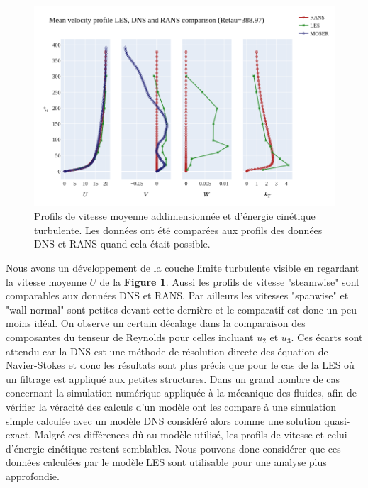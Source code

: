 \documentclass[12pt]{article}   %
\theoremstyle{plain}
\theoremstyle{remark}
\begin{document}
\begin{figure}[H]
	\begin{center}
		\includegraphics[width=0.8\linewidth]{../../output/figures/channel_wrles_retau395/split_time/RANS/RANS_LES_MOSER_profiles_all.png}
		\caption{Profils de vitesse moyenne addimensionnée et d'énergie cinétique turbulente. Les données ont été comparées aux profils des données DNS et RANS quand cela était possible.}
		\label{fig:mean-vel}
	\end{center}
\end{figure}

Nous avons un développement de la couche limite turbulente visible en regardant la vitesse moyenne $U$ de la \textbf{Figure \ref{fig:mean-vel}}. Aussi les profils de vitesse "steamwise" sont comparables aux données DNS et RANS. Par ailleurs les vitesses "spanwise" et "wall-normal" sont petites devant cette dernière et le comparatif est donc un peu moins idéal. On observe un certain décalage dans la comparaison des composantes du tenseur de Reynolds pour celles incluant $u_2$ et $u_3$. Ces écarts sont attendu car la DNS est une méthode de résolution directe des équation de Navier-Stokes et donc les résultats sont plus précis que pour le cas de la LES où un filtrage est appliqué aux petites structures. Dans un grand nombre de cas concernant la simulation numérique appliquée à la mécanique des fluides, afin de vérifier la véracité des calculs d'un modèle ont les compare à une simulation simple calculée avec un modèle DNS considéré alors comme une solution quasi-exact. Malgré ces différences dû au modèle utilisé, les profils de vitesse et celui d'énergie cinétique restent semblables. Nous pouvons donc considérer que ces données calculées par le modèle LES sont utilisable pour une analyse plus approfondie. \\
\end{document}
